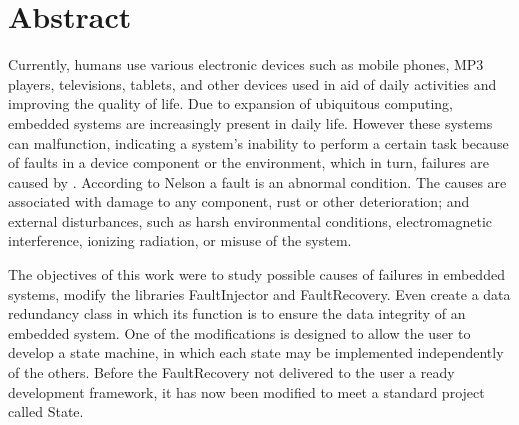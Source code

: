 
\chapter*{Abstract}

Currently, humans use various electronic devices such as mobile phones, MP3 players, televisions, tablets, and other devices used in aid of daily activities and improving the quality of life. Due to expansion of ubiquitous computing, embedded systems are increasingly present in daily life. However these systems can malfunction, indicating a system's inability to perform a certain task because of faults in a device component or the environment, which in turn, failures are caused by \cite{Nelson:1990}. According to Nelson \cite{Nelson:1990} a fault is an abnormal condition. The causes are associated with damage to any component, rust or other deterioration; and external disturbances, such as harsh environmental conditions, electromagnetic interference, ionizing radiation, or misuse of the system.

The objectives of this work were to study possible causes of failures in embedded systems, modify the libraries FaultInjector and FaultRecovery. Even create a data redundancy class in which its function is to ensure the data integrity of an embedded system. One of the modifications is designed to allow the user to develop a state machine, in which each state may be implemented independently of the others. Before the FaultRecovery not delivered to the user a ready development framework, it has now been modified to meet a standard project called State.

